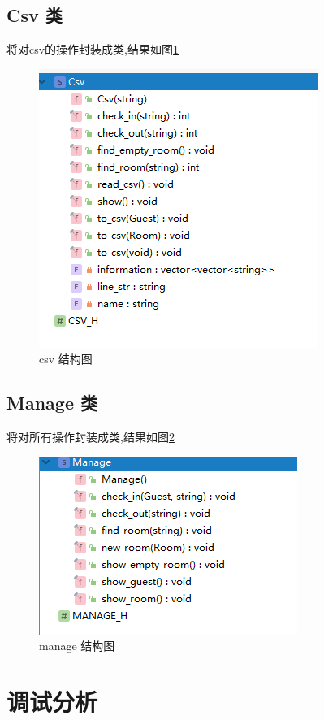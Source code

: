 \documentclass[UTF8]{ctexart}
\begin{document}
  \subsection{Csv 类}
    将对csv的操作封装成类,结果如图\ref{fig:structure_csv}
    \begin{figure}[H]
        \centering
        \includegraphics[scale = 1]{structure_csv}
        \caption{csv 结构图}
        \label{fig:structure_csv}
      \end{figure}

  \subsection{Manage 类}
    将对所有操作封装成类,结果如图\ref{fig:structure_manage}
    \begin{figure}[H]
        \centering
        \includegraphics[scale = 1]{structure_manage}
        \caption{manage 结构图}
        \label{fig:structure_manage}
      \end{figure}
\section{调试分析}
\end{document}
